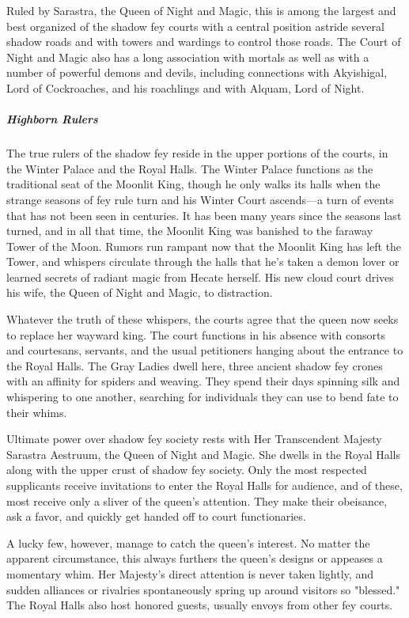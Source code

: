 \documentclass[10pt,a4paper,twoside,bg=print,twocolumn,openany,nodeprecatedcode]{dndbook}
\begin{document}
Ruled by Sarastra, the Queen of Night and Magic, this is among the largest and best organized of the shadow fey courts with a central position astride several shadow roads and with towers and wardings to control those roads. The Court of Night and Magic also has a long association with mortals as well as with a number of powerful demons and devils, including connections with Akyishigal, Lord of Cockroaches, and his roachlings and with Alquam, Lord of Night.

\subparagraph{Highborn Rulers}
The true rulers of the shadow fey reside in the upper portions of the courts, in the Winter Palace and the Royal Halls. The Winter Palace functions as the traditional seat of the Moonlit King, though he only walks its halls when the strange seasons of fey rule turn and his Winter Court ascends—a turn of events that has not been seen in centuries. It has been many years since the seasons last turned, and in all that time, the Moonlit King was banished to the faraway Tower of the Moon. Rumors run rampant now that the Moonlit King has left the Tower, and whispers circulate through the halls that he's taken a demon lover or learned secrets of radiant magic from Hecate herself. His new cloud court drives his wife, the Queen of Night and Magic, to distraction.

Whatever the truth of these whispers, the courts agree that the queen now seeks to replace her wayward king. The court functions in his absence with consorts and courtesans, servants, and the usual petitioners hanging about the entrance to the Royal Halls. The Gray Ladies dwell here, three ancient shadow fey crones with an affinity for spiders and weaving. They spend their days spinning silk and whispering to one another, searching for individuals they can use to bend fate to their whims.

Ultimate power over shadow fey society rests with Her Transcendent Majesty Sarastra Aestruum, the Queen of Night and Magic. She dwells in the Royal Halls along with the upper crust of shadow fey society. Only the most respected supplicants receive invitations to enter the Royal Halls for audience, and of these, most receive only a sliver of the queen's attention. They make their obeisance, ask a favor, and quickly get handed off to court functionaries.

A lucky few, however, manage to catch the queen's interest. No matter the apparent circumstance, this always furthers the queen's designs or appeases a momentary whim. Her Majesty's direct attention is never taken lightly, and sudden alliances or rivalries spontaneously spring up around visitors so "blessed." The Royal Halls also host honored guests, usually envoys from other fey courts.
\end{document}
